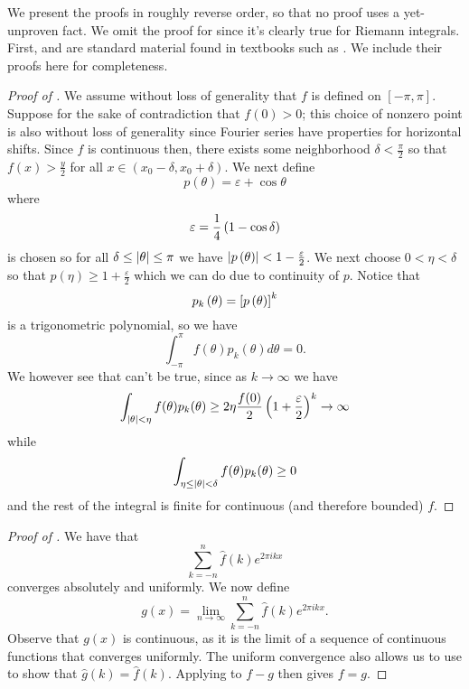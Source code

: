 \documentclass{article}
\begin{document}
We present the proofs in roughly reverse order, so that no proof uses a yet-unproven fact.
We omit the proof for  since it's clearly true for Riemann integrals.
First,  and  are standard material found in textbooks such as \cite{fourier-textbook}.
We include their proofs here for completeness.

\begin{proof}[Proof of ]
	We assume without loss of generality that $f$ is defined on $[-\pi, \pi]$.
	Suppose for the sake of contradiction that $f(0)>0$; this choice of nonzero point is also without loss of generality since Fourier series have properties for horizontal shifts.
	Since $f$ is continuous then, there exists some neighborhood $\delta<\frac{\pi}{2}$ so that $f(x)>\frac{y}{2}$ for all $x\in(x_0 - \delta, x_0 + \delta)$.
	We next define
	\begin{equation}
		p(\theta)=\varepsilon+\cos\theta
	\end{equation}
	where
	$$\varepsilon=\frac{1}{4}\left(1-\cos\delta\right)$$
	is chosen so for all $\delta\leq\abs{\theta}\leq\pi$ we have $\abs{p\left(\theta\right)}<1-\frac{\varepsilon}{2}$.
	We next choose $0<\eta<\delta$ so that $p(\eta)\geq 1 +\frac{\varepsilon}{2}$ which we can do due to continuity of $p$.
	Notice that
	$$p_k\left(\theta\right)=\left[p\left(\theta\right)\right]^k$$
	is a trigonometric polynomial, so we have
	\begin{equation*}
		\int_{-\pi}^\pi f(\theta) p_k(\theta)d\theta = 0.
	\end{equation*}
	We however see that can't be true, since as $k\rightarrow\infty$ we have
	\begin{equation*}
		\int_{\abs{\theta}<\eta}f(\theta)p_k(\theta)\geq 2\eta\frac{f(0)}{2}\left(1+\frac{\varepsilon}{2}\right)^k\rightarrow\infty
	\end{equation*}
	while
	\begin{equation*}
		\int_{\eta\leq\abs{\theta}<\delta}f(\theta)p_k(\theta)\geq 0
	\end{equation*}
	and the rest of the integral is finite for continuous (and therefore bounded) $f$.
\end{proof}

\begin{proof}[Proof of ]
	We have that
	\begin{equation}
		\sum_{k=-n}^n \hat{f}(k) e^{2\pi i k x}
	\end{equation}
	converges absolutely and uniformly.
	We now define
	\begin{equation}
		g(x)=\lim_{n\rightarrow\infty}\sum_{k=-n}^n \hat{f}(k) e^{2\pi i k x}.
	\end{equation}
	Observe that $g(x)$ is continuous, as it is the limit of a sequence of continuous functions that converges uniformly.
	The uniform convergence also allows us to use  to show that $\hat{g}(k)=\hat{f}(k)$.
	Applying  to $f-g$ then gives $f=g$.
\end{proof}
\end{document}
